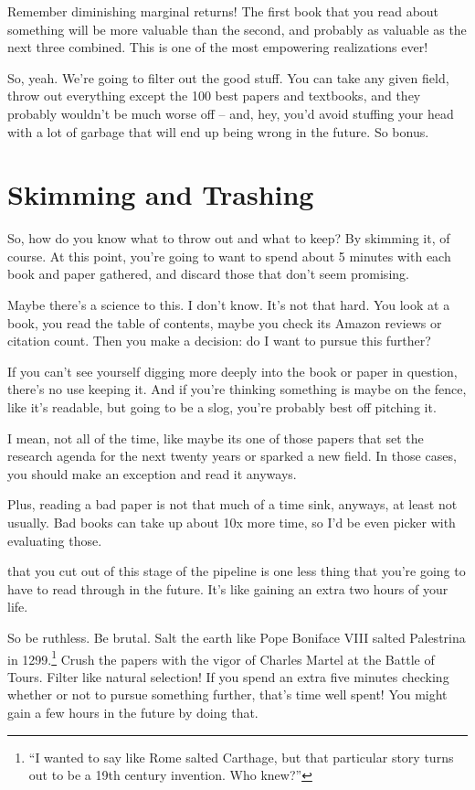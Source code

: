 Remember diminishing marginal returns! The first book that you read about something will
be more valuable than the second, and probably as valuable as the next three
combined. This is one of the most empowering realizations ever!


So, yeah. We're going to filter out the good stuff. You can take any given
field, throw out everything except the 100 best papers and textbooks, and they
probably wouldn't be much worse off -- and, hey, you'd avoid stuffing your head
with a lot of garbage that will end up being wrong in the future. So bonus.

\section{Skimming and Trashing}

So, how do you know what to throw out and what to keep? By skimming it, of
course. At this point, you're going to want to spend about 5 minutes with each
book and paper gathered, and discard those that don't seem promising.

Maybe there's a science to this. I don't know. It's not that hard. You look at a
book, you read the table of contents, maybe you check its Amazon reviews or
citation count. Then you make a decision: do I want to pursue this further?

If you can't see yourself digging more deeply into the book or paper in
question, there's no use keeping it. And if you're thinking something is maybe on
the fence, like it's readable, but going to be a slog, you're probably best off
pitching it.

I mean, not all of the time, like maybe its one of those papers that set the research
agenda for the next twenty years or sparked a new field. In those cases, you
should make an exception and read it anyways.

Plus, reading a bad paper is not that much of a time sink, anyways, at least not
usually. Bad books can take up about 10x more time, so I'd be even picker with
evaluating those.

 that you cut out of this stage of the
pipeline is one less thing that you're going to have to read through in the
future. It's like gaining an extra two hours of your life.

So be ruthless. Be brutal. Salt the earth like Pope Boniface VIII salted Palestrina in 1299.\footnote{``I wanted to say like Rome salted Carthage, but that particular story turns out to be a 19th century invention. Who knew?''} Crush the papers with the vigor of Charles Martel at the Battle of Tours. Filter like natural selection! If
you spend an extra five minutes checking whether or not to pursue something
further, that's time well spent! You might gain a few hours in the future by
doing that.

